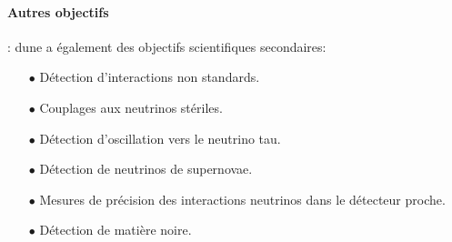       \paragraph{Autres objectifs} : \gls{dune} a également des objectifs scientifiques secondaires:
      \begin{itemize}
        \item[$\bullet$] Détection d'interactions non standards.%
        \item[$\bullet$] Couplages aux neutrinos stériles.%
        \item[$\bullet$] Détection d'oscillation vers le neutrino tau.%
        \item[$\bullet$] Détection de neutrinos de supernovae.%
        \item[$\bullet$] Mesures de précision des interactions neutrinos dans le détecteur proche.%
        \item[$\bullet$] Détection de matière noire.%
      \end{itemize}

